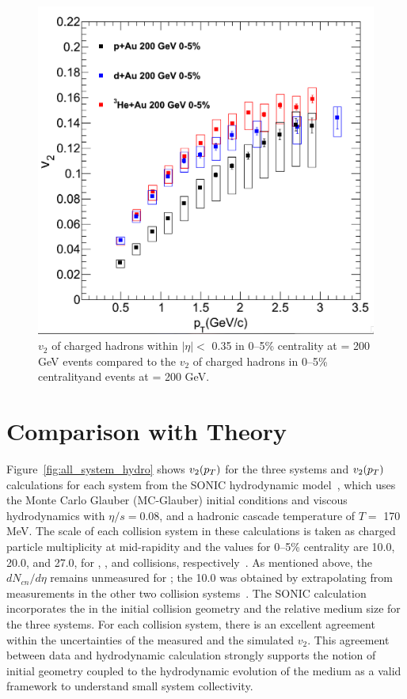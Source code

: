 \begin{figure}[!ht]
\begin{center}
\includegraphics[width=0.65\linewidth]{figs/v2_3_sys_compare_nohydro.png}
\caption{$v_2$ of charged hadrons within $|\eta| <$ 0.35 in 0--5\% centrality \pau at \sqsn = 200 GeV events compared to the $v_2$ of charged hadrons in 0--5\% centrality\dau and \hau events at \sqsn = 200 GeV.}
\label{fig:v2_3_sys_compare_nohydro}
\end{center}
\end{figure}

\section{Comparison with Theory}
Figure~\ref{fig:all_system_hydro} shows $v_2(\mbox{$p_T$})$ for the three systems and $v_2(\mbox{$p_T$})$ calculations for each system from the SONIC hydrodynamic model~\cite{Habich:2014jna}, which uses the Monte Carlo Glauber (MC-Glauber) initial conditions and viscous hydrodynamics with $\eta/s=0.08$, and a hadronic cascade temperature of $T=$ 170 MeV. The scale of each collision system in these calculations is taken as charged particle multiplicity at mid-rapidity and the values for 0--5\% centrality are 10.0, 20.0, and 27.0, for \pau, \dau, and \hau collisions, respectively~\cite{Habich:2014jna}. As mentioned above, the $dN_{cn}/d\eta$ remains unmeasured for \pau; the 10.0 was obtained by extrapolating from measurements in the other two collision systems~\cite{Habich:2014jna}. The SONIC calculation incorporates the in the initial collision geometry and the relative medium size for the three systems. For each collision system, there is an excellent agreement within the uncertainties of the measured and the simulated $v_2$. This agreement between data and hydrodynamic calculation strongly supports the notion of initial geometry coupled to the hydrodynamic evolution of the medium as a valid framework to understand small system collectivity.


